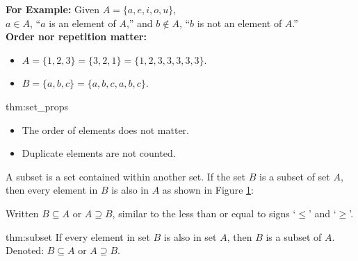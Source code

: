 \noindent
\textbf{For Example:} Given $A = \{a, e, i, o, u\}$,\\
$a \in A$, ``$a$ is an element of $A$,'' and
$b \notin A$, ``$b$ is not an element of $A$.''\\

\noindent
\textbf{Order nor repetition matter:}
\begin{itemize}
    \item $A = \{1, 2, 3\} = \{3, 2, 1\} = \{1, 2, 3, 3, 3, 3, 3\}$.
    \item $B = \{a, b, c\} = \{a, b, c, a, b, c\}$.
\end{itemize}

\begin{theo}{thm:set_props}
    \begin{itemize}
        \item The order of elements does not matter.
        \item Duplicate elements are not counted.
    \end{itemize}
\end{theo}

\noindent
A subset is a set contained within another set. If the set $B$ is a subset of set $A$,
then every element in $B$ is also in $A$ as shown in Figure \ref{fig:subset}:


\begin{figure}[ht]
    \centering
    \caption{}
    \label{fig:subset}
\end{figure}


\noindent
Written $B \subseteq A$ or $A \supseteq B$, similar to the less than or
equal to signs `$\leq$' and `$\geq$'.

\begin{theo}[Subset]{thm:subset}
    If every element in set $B$ is also in set $A$, then $B$ is a subset of $A$.\\
    Denoted: $B \subseteq A$ or $A \supseteq B$.
\end{theo}

